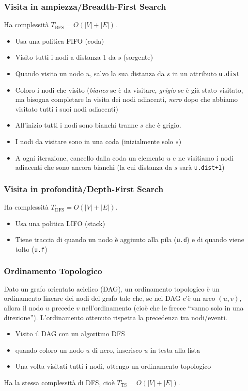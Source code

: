 \documentclass[10pt,a4paper]{article}
\newcommand{\code}{\texttt}
\begin{document}
\begin{multicols*}{2}
\subsubsection*{Visita in ampiezza/Breadth-First Search}
Ha complessità $T_\text{BFS} = O(|V| + |E|)$.
\begin{itemize}
    \item Usa una politica FIFO (coda)
    \item Visito tutti i nodi a distanza 1 da $s$ (sorgente)
    \item Quando visito un nodo $u$, salvo la sua distanza da $s$ in un attributo \code{u.dist}
    \item Coloro i nodi che visito (\emph{bianco} se è da visitare, \emph{grigio} se è già stato visitato, ma bisogna completare la visita dei nodi adiacenti, \emph{nero} dopo che abbiamo visitato tutti i suoi nodi adiacenti)
    \item All'inizio tutti i nodi sono bianchi tranne $s$ che è grigio.
    \item I nodi da visitare sono in una coda (inizialmente solo $s$)
    \item A ogni iterazione, cancello dalla coda un elemento $u$ e ne visitiamo i nodi adiacenti che sono ancora bianchi (la cui distanza da $s$ sarà \code{u.dist+1})
\end{itemize}

\subsubsection*{Visita in profondità/Depth-First Search}
Ha complessità $T_\text{DFS} = O(|V| + |E|)$.
\begin{itemize}
    \item Usa una politica LIFO (stack)
    \item Tiene traccia di quando un nodo è aggiunto alla pila (\code{u.d}) e di quando viene tolto (\code{u.f})
\end{itemize}

\subsubsection*{Ordinamento Topologico}
Dato un grafo orientato aciclico (DAG), un ordinamento topologico è un ordinamento lineare dei nodi del grafo tale che, se nel DAG c'è un arco $(u,v)$, allora il nodo $u$ precede $v$ nell'ordinamento (cioè che le frecce ``vanno solo in una direzione''). L'ordinamento ottenuto rispetta la precedenza tra nodi/eventi.
\begin{itemize}
    \item Visito il DAG con un algoritmo DFS
    \item quando coloro un nodo $u$ di nero, inserisco $u$ in testa alla lista
    \item Una volta visitati tutti i nodi, ottengo un ordinamento topologico 
\end{itemize}
Ha la stessa complessità di DFS, cioè $T_\text{TS} = O(|V| + |E|)$.


\end{multicols*}
\end{document}
